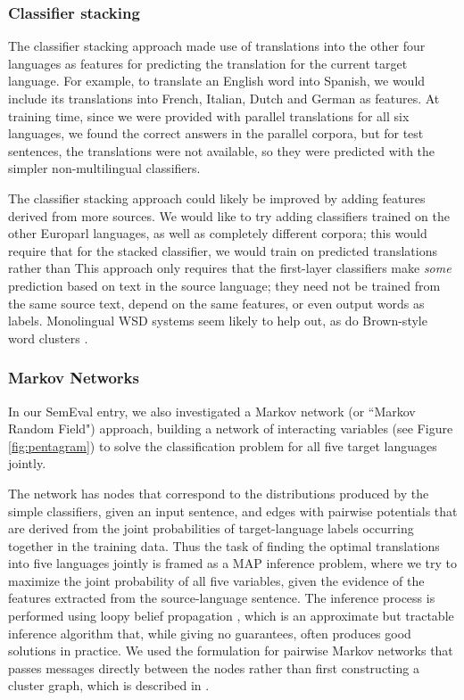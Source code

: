 \subsubsection{Classifier stacking}
The classifier stacking approach made use of translations into the other four
languages as features for predicting the translation for the current target
language.
For example, to translate an English word into Spanish, we would include its
translations into French, Italian, Dutch and German as features.
At training time, since we were provided with parallel translations for all six
languages, we found the correct answers in the parallel corpora, but for test
sentences, the translations were not available, so they were predicted with the
simpler non-multilingual classifiers.

The classifier stacking approach could likely be improved by adding features
derived from more sources.
We would like to try adding classifiers trained on the other Europarl
languages, as well as completely different corpora; this would require that for
the stacked classifier, we would train on predicted translations rather than
This approach only requires that the first-layer classifiers make \emph{some}
prediction based on text in the source language;
they need not be trained from the same source text, depend on the same
features, or even output words as labels. Monolingual WSD systems seem likely
to help out, as do Brown-style word clusters \cite{brown1992class}.

\subsubsection{Markov Networks}
In our SemEval entry, we also investigated a Markov network (or ``Markov Random
Field") approach, building a network of interacting variables (see Figure
\ref{fig:pentagram}) to solve the classification problem for all five target
languages jointly.

The network has nodes that correspond to the distributions produced by the
simple classifiers, given an input sentence, and edges with pairwise potentials
that are derived from the joint probabilities of target-language labels
occurring together in the training data. 
Thus the task of finding the optimal translations into five languages jointly
is framed as a MAP inference problem, where we try to maximize the joint
probability of all five variables, given the evidence of the features extracted
from the source-language sentence.
The inference process is performed using loopy belief propagation
\cite{DBLP:conf/uai/MurphyWJ99}, which is an approximate but tractable
inference algorithm that, while giving no guarantees, often produces good
solutions in practice.
We used the formulation for pairwise Markov networks that passes messages
directly between the nodes rather than first constructing a cluster graph,
which is described in \cite[\S 11.3.5.1]{Koller+Friedman:09}.

